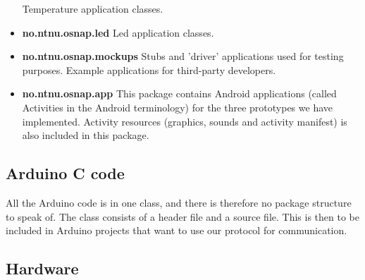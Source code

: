 \begin{itemize}
		Temperature application classes.
	\item \textbf{no.ntnu.osnap.led}\newline
		Led application classes.
	\item \textbf{no.ntnu.osnap.mockups}  \newline
		Stubs and 'driver' applications used for testing purposes.
		Example applications for third-party developers.
	\item \textbf{no.ntnu.osnap.app} \newline
		This package contains Android applications (called Activities in the Android terminology) for the three prototypes
		we have implemented. Activity resources (graphics, sounds and activity manifest) is also included in this package.
\end{itemize}

\subsection{Arduino C code}
All the Arduino code is in one class, and there is therefore no package structure to speak of.
The class consists of a header file and a source file. This is then to be included in Arduino projects
that want to use our protocol for communication.


\subsection{Hardware}

